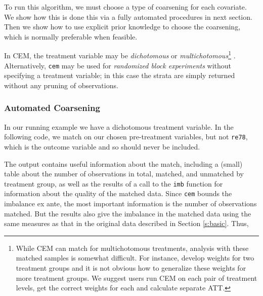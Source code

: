 \documentclass[11pt,titlepage]{article}
\begin{document}
To run this algorithm, we must choose a type of coarsening for each
covariate.  We show how this is done this via a fully automated procedures
in next section.  Then we show how to use explicit prior knowledge to
choose the coarsening, which is normally preferable when feasible.

In CEM, the treatment variable may be \emph{dichotomous} or
\emph{multichotomous}\footnote{ While CEM can match for multichotomous
  treatments, analysis with these matched samples is somewhat difficult.
  For instance, \citet{IacKinPor12} develop weights for two treatment
  groups and it is not obvious how to generalize these weights for more
  treatment groups. We suggest users run CEM on each pair of treatment
  levels, get the correct weights for each and calculate separate ATT.} .
Alternatively, \texttt{cem} may be used for \emph{randomized block
  experiments} without specifying a treatment variable; in this case the
strata are simply returned without any pruning of observations.

\subsubsection{Automated Coarsening}\label{s:cem-auto}

In our running example we have a dichotomous treatment variable.  In the
following code, we match on our chosen pre-treatment variables, but not
\texttt{re78}, which is the outcome variable and so should never be
included.

The output contains useful information about the match, including a
(small) table about the number of observations in total, matched, and
unmatched by treatment group, as well as the results of a call to the
\texttt{imb} function for information about the quality of the
matched data. Since \texttt{cem} bounds the imbalance ex ante, the most
important information is the number of observations matched.  But the
results also give the imbalance in the matched data using the same
measures as that in the original data described in Section \ref{s:basic}.
Thus,
\end{document}
